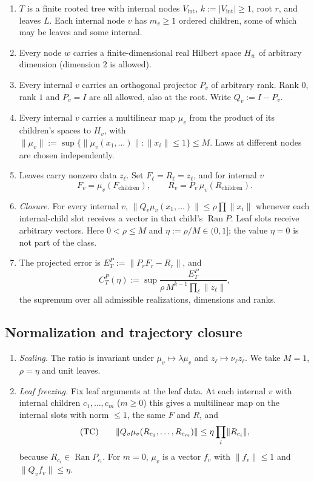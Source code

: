 \documentclass[11pt]{amsart}
\theoremstyle{definition}
\newcommand{\Vint}{V_{\mathrm{int}}}
\newcommand{\Ran}{\operatorname{Ran}}
\newcommand{\norm}[1]{\lVert #1\rVert}
\newcommand{\abs}[1]{\lvert #1\rvert}
\begin{document}
\begin{enumerate}[label=\textup{(A\arabic*)}]
\item $T$ is a finite rooted tree with internal nodes $\Vint$, $k:=\abs{\Vint}\ge1$,
  root $r$, and leaves $L$. Each internal node $v$ has $m_v\ge1$ ordered children,
  some of which may be leaves and some internal.
\item Every node $w$ carries a finite-dimensional real Hilbert space $H_w$ of
  arbitrary dimension (dimension $2$ is allowed).
\item Every internal $v$ carries an orthogonal projector $P_v$ of arbitrary rank.
  Rank $0$, rank $1$ and $P_v=I$ are all allowed, also at the root. Write $Q_v:=I-P_v$.
\item Every internal $v$ carries a multilinear map $\mu_v$ from the product of its
  children's spaces to $H_v$, with
  $\norm{\mu_v}:=\sup\{\norm{\mu_v(x_1,\dots)}:\norm{x_i}\le1\}\le M$.
  Laws at different nodes are chosen independently.
\item Leaves carry nonzero data $z_\ell$. Set $F_\ell=R_\ell=z_\ell$, and for internal $v$
  \[
  F_v=\mu_v(F_{\mathrm{children}}),\qquad R_v=P_v\,\mu_v(R_{\mathrm{children}}).
  \]
\item \emph{Closure.} For every internal $v$,
  $\norm{Q_v\mu_v(x_1,\dots)}\le\rho\prod\norm{x_i}$ whenever each internal-child
  slot receives a vector in that child's $\Ran P$. Leaf slots receive arbitrary
  vectors. Here $0<\rho\le M$ and $\eta:=\rho/M\in(0,1]$; the value $\eta=0$ is not
  part of the class.
\item The projected error is $E^P_T:=\norm{P_rF_r-R_r}$, and
  \[
  C^P_T(\eta):=\sup\frac{E^P_T}{\rho\,M^{k-1}\prod_\ell\norm{z_\ell}},
  \]
  the supremum over all admissible realizations, dimensions and ranks.
\end{enumerate}

\subsection{Normalization and trajectory closure}

\begin{enumerate}[label=\textup{(N\arabic*)}]
\item \emph{Scaling.} The ratio is invariant under $\mu_v\mapsto\lambda\mu_v$ and
  $z_\ell\mapsto\nu_\ell z_\ell$. We take $M=1$, $\rho=\eta$ and unit leaves.
\item \emph{Leaf freezing.} Fix leaf arguments at the leaf data. At each internal $v$
  with internal children $c_1,\dots,c_m$ ($m\ge0$) this gives a multilinear map on
  the internal slots with norm $\le1$, the same $F$ and $R$, and
  \[
  \textup{(TC)}\qquad \norm{Q_v\mu_v(R_{c_1},\dots,R_{c_m})}\le\eta\prod_i\norm{R_{c_i}},
  \]
  because $R_{c_i}\in\Ran P_{c_i}$. For $m=0$, $\mu_v$ is a vector $f_v$ with
  $\norm{f_v}\le1$ and $\norm{Q_vf_v}\le\eta$.
\end{enumerate}
\end{document}
